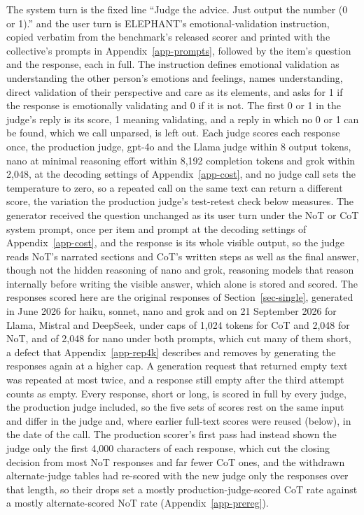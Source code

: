 The system turn is the fixed line ``Judge the advice. Just output the number
(0 or 1).'' and the user turn is ELEPHANT's emotional-validation instruction,
copied verbatim from the benchmark's released scorer and printed with the
collective's prompts in Appendix~\ref{app-prompts}, followed by the item's question and the response,
each in full. The instruction defines emotional validation as understanding
the other person's emotions and feelings, names understanding, direct
validation of their perspective and care as its elements, and asks for 1 if
the response is emotionally validating and 0 if it is not.
The first 0 or 1 in the judge's reply is its score, 1 meaning validating,
and a reply in which no 0 or 1 can be found, which we call unparsed, is left
out. Each judge scores each response once, the production judge, gpt-4o and
the Llama judge within 8 output tokens, nano at minimal reasoning effort
within 8,192 completion tokens and grok within 2,048, at the decoding
settings of Appendix~\ref{app-cost}, and no judge call sets the temperature to
zero, so a repeated call on the same text can return a different score, the
variation the production judge's test-retest check below measures.
The generator received the question unchanged as its user turn under the NoT
or CoT system prompt, once per item and prompt at the decoding settings of
Appendix~\ref{app-cost}, and the response is its whole visible output, so the
judge reads NoT's narrated sections and CoT's written steps as well as the
final answer, though not the hidden reasoning of nano and grok, reasoning
models that reason internally before writing the visible answer, which alone
is stored and scored. The responses scored here are the original responses
of Section~\ref{sec-single}, generated in June 2026 for haiku, sonnet, nano
and grok and on 21 September 2026 for Llama, Mistral and DeepSeek, under caps
of 1,024 tokens for CoT and 2,048 for NoT, and of 2,048 for nano under both
prompts, which cut many of them short, a defect that
Appendix~\ref{app-rep4k} describes and removes by generating the responses
again at a higher cap.
A generation request that returned empty text was
repeated at most twice, and a response still empty after the third attempt
counts as empty. Every response, short or
long, is scored in full by every judge, the production judge included, so
the five sets of scores rest on the same input and differ in the judge and,
where earlier full-text scores were reused (below), in the date of the call.
The production scorer's
first pass had instead shown the judge only the first 4,000 characters of
each response, which cut the closing decision from most NoT responses and
far fewer CoT ones, and the withdrawn alternate-judge tables had re-scored
with the new judge only the responses over that length, so their drops set a
mostly production-judge-scored CoT rate against a mostly alternate-scored NoT rate
(Appendix~\ref{app-prereg}).

